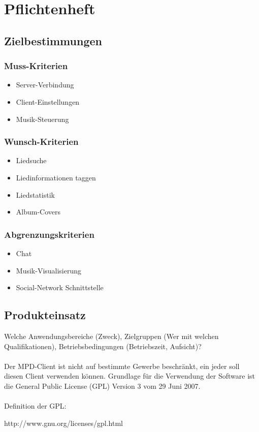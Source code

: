 \chapter{Pflichtenheft}
\section{Zielbestimmungen}
\subsection{Muss-Kriterien}
\renewcommand{\labelitemi}{•}
\begin{itemize}
	\item Server-Verbindung
	\item Client-Einstellungen
	\item Musik-Steuerung
\end{itemize}
\subsection{Wunsch-Kriterien}
\begin{itemize}
	\item Liedsuche
	\item Liedinformationen taggen
	\item Liedstatistik
	\item Album-Covers
\end{itemize}
\subsection{Abgrenzungskriterien}
\begin{itemize}
	\item Chat
	\item Musik-Visualisierung
	\item Social-Network Schnittstelle
\end{itemize}
\section{Produkteinsatz}
Welche Anwendungsbereiche (Zweck), Zielgruppen (Wer mit welchen Qualifikationen), Betriebsbedingungen (Betriebszeit,
Aufsicht)?\ \\ \\
Der MPD-Client ist nicht auf bestimmte Gewerbe beschränkt, ein jeder soll diesen Client
verwenden können. Grundlage für die Verwendung der Software ist die General Public License (GPL)
Version 3 vom 29 Juni 2007.\ \\ \\
Definition der GPL:
\begin{center}
http://www.gnu.org/licenses/gpl.html
\end{center}
